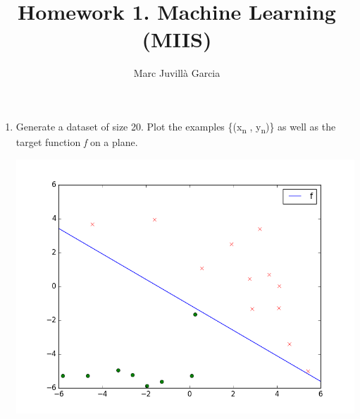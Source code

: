 \documentclass{article}
\author{Marc Juvillà Garcia}
\title{Homework 1. Machine Learning (MIIS)}
\begin{document}
\maketitle

\begin{enumerate}[label=(\alph*)]
\item Generate a dataset of size 20. Plot the examples \{(x\textsubscript{n} , y\textsubscript{n})\} as well as the target function \textit{f} on a plane.
\begin{center}
\includegraphics[scale=0.4]{images/1.png} 
\end{center}


\end{enumerate}
\end{document}
